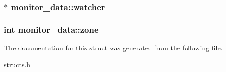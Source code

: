 \hypertarget{structmonitor__data_acee0bcdec1d76169428fb2c9969df392}{
\subsubsection[{watcher}]{$\ast$ monitor\-\_\-data\-::watcher}}\label{structmonitor__data_acee0bcdec1d76169428fb2c9969df392}
\hypertarget{structmonitor__data_aead6e5b82198d45c89c0ca33b4f4470b}{
\subsubsection[{zone}]{\setlength{\rightskip}{0pt plus 5cm}int monitor\-\_\-data\-::zone}}\label{structmonitor__data_aead6e5b82198d45c89c0ca33b4f4470b}


The documentation for this struct was generated from the following file\-:\begin{DoxyCompactItemize}
\item 
\hyperlink{structs_8h}{structs.\-h}\end{DoxyCompactItemize}
